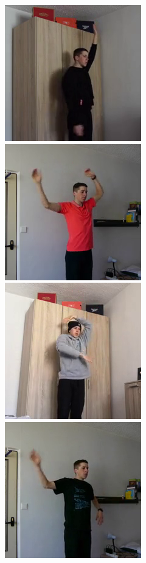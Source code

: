 \begin{figure}[!ht]
{    }
    \centerline{
        \includegraphics[scale=0.46]{figures/dataset_upper_body/scene026_cam0_image00182.png}
        \includegraphics[scale=0.46]{figures/dataset_upper_body/scene020_cam0_image00026.png}
        \includegraphics[scale=0.46]{figures/dataset_upper_body/scene027_cam2_image00022.png}
        \includegraphics[scale=0.46]{figures/dataset_upper_body/scene021_cam0_image00006.png}
}
\end{figure}

